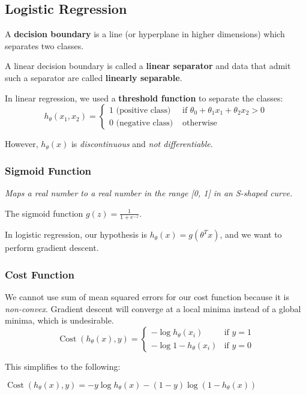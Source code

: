 \subsection{Logistic Regression}
A \textbf{decision boundary} is a line (or hyperplane in higher dimensions) which separates two classes.

A linear decision boundary is called a \textbf{linear separator} and data that admit such a separator 
are called \textbf{linearly separable}.

In linear regression, we used a \textbf{threshold function} to separate the classes:\\[-0.2em]
\[ h_\theta(x_1, x_2) =
    \begin{cases}
        1 \text{ (positive class) } & \text{if } \theta_0 + \theta_1 x_1 + \theta_2 x_2 > 0 \\
        0 \text{ (negative class)  }& \text{otherwise}
    \end{cases}
\]

However, $h_\theta(x)$ is \emph{discontinuous} and \emph{not differentiable}.

\subsubsection{Sigmoid Function}
\emph{Maps a real number to a real number in the range [0, 1] in an S-shaped curve.}

The sigmoid function
$g(z) = \frac{1}{1 + e^{-z}}$.

In logistic regression, our hypothesis is
$h_\theta(x) = g(\theta^T x)$,
and we want to perform gradient descent.

\subsubsection{Cost Function}
We cannot use sum of mean squared errors for our cost function because it is \emph{non-convex}.
Gradient descent will converge at a local minima instead of a global minima, which is undesirable.\\[-0.2em]
\[ \operatorname{Cost}(h_\theta(x), y) =
    \begin{cases}
        -\log h_\theta(x_i) & \text{if } y = 1 \\
        -\log 1 - h_\theta(x_i) & \text{if } y = 0
    \end{cases}
\]

This simplifies to the following:

$\operatorname{Cost}(h_\theta(x), y) = -y \log h_\theta(x) - (1 - y) \log (1 - h_\theta(x))$

